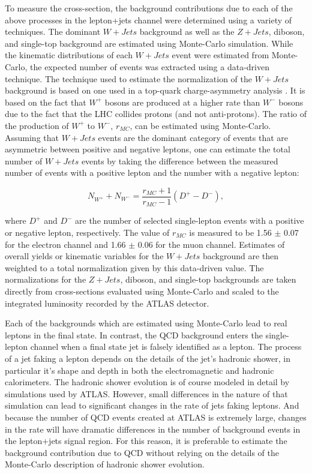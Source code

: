 To measure the cross-section, the background contributions due to each of the above processes in the lepton+jets channel were determined using a variety of techniques.
The dominant $W+Jets$ background as well as the $Z+Jets$, diboson, and single-top background are estimated using Monte-Carlo simulation.
While the kinematic distributions of each $W+Jets$ event were estimated from Monte-Carlo, the expected number of events was extracted using a data-driven technique.
The technique used to estimate the normalization of the $W+Jets$ background is based on one used in a top-quark charge-asymmetry analysis \cite{CHARGE_ASYMMETRY}.
It is based on the fact that $W^{+}$ bosons are produced at a higher rate than $W^{-}$ bosons due to the fact that the LHC collides protons (and not anti-protons).
The ratio of the production of $W^{+}$ to $W^{-}$, $r_{MC}$, can be estimated using Monte-Carlo.  Assuming that $W+Jets$ events are the dominant category of events that are asymmetric between positive and negative leptons, one can estimate the total number of $W+Jets$ events by taking the difference between the measured number of events with a positive lepton and the number with a negative lepton:

\begin{equation}
  N_{W^{+}} + N_{W^{-}} = \frac{r_{MC} + 1}{r_{MC} - 1}(D^{+} - D^{-}),
\end{equation}

where $D^{+}$ and $D^{-}$ are the number of selected single-lepton events with a positive or negative lepton, respectively.
The value of $r_{MC}$ is measured to be 1.56 $\pm$ 0.07 for the electron channel and 1.66 $\pm$ 0.06 for the muon channel.
Estimates of overall yields or kinematic variables for the $W+Jets$ background are then weighted to a total normalization given by this data-driven value.
The normalizations for the $Z+Jets$, diboson, and single-top backgrounds are taken directly from cross-sections evaluated using Monte-Carlo and scaled to the integrated luminosity recorded by the ATLAS detector.

Each of the backgrounds which are estimated using Monte-Carlo lead to real leptons in the final state.
In contrast, the QCD background enters the single-lepton channel when a final state jet is falsely identified as a lepton.
The process of a jet faking a lepton depends on the details of the jet's hadronic shower, in particular it's shape and depth in both the electromagnetic and hadronic calorimeters.
The hadronic shower evolution is of course modeled in detail by simulations used by ATLAS.
However, small differences in the nature of that simulation can lead to significant changes in the rate of jets faking leptons.
And because the number of QCD events created at ATLAS is extremely large, changes in the rate will have dramatic differences in the number of background events in the lepton+jets signal region.
For this reason, it is preferable to estimate the background contribution due to QCD without relying on the details of the Monte-Carlo description of hadronic shower evolution.

